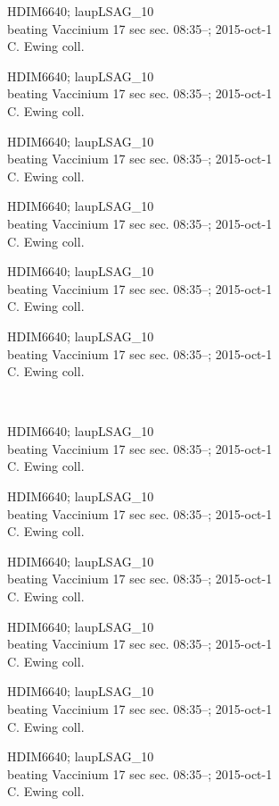 \documentclass[2pt]{extarticle}
\begin{document}
\noindent
\parbox{0.16\textwidth}{\tiny \raggedright \rule[-0.3\baselineskip]{0pt}{10pt}HDIM6640; laupLSAG\_10\\ beating Vaccinium 17 sec sec. 08:35--; 2015-oct-1\\ C. Ewing coll.}
\parbox{0.16\textwidth}{\tiny \raggedright \rule[-0.3\baselineskip]{0pt}{10pt}HDIM6640; laupLSAG\_10\\ beating Vaccinium 17 sec sec. 08:35--; 2015-oct-1\\ C. Ewing coll.}
\parbox{0.16\textwidth}{\tiny \raggedright \rule[-0.3\baselineskip]{0pt}{10pt}HDIM6640; laupLSAG\_10\\ beating Vaccinium 17 sec sec. 08:35--; 2015-oct-1\\ C. Ewing coll.}
\parbox{0.16\textwidth}{\tiny \raggedright \rule[-0.3\baselineskip]{0pt}{10pt}HDIM6640; laupLSAG\_10\\ beating Vaccinium 17 sec sec. 08:35--; 2015-oct-1\\ C. Ewing coll.}
\parbox{0.16\textwidth}{\tiny \raggedright \rule[-0.3\baselineskip]{0pt}{10pt}HDIM6640; laupLSAG\_10\\ beating Vaccinium 17 sec sec. 08:35--; 2015-oct-1\\ C. Ewing coll.}
\parbox{0.16\textwidth}{\tiny \raggedright \rule[-0.3\baselineskip]{0pt}{10pt}HDIM6640; laupLSAG\_10\\ beating Vaccinium 17 sec sec. 08:35--; 2015-oct-1\\ C. Ewing coll.} \\ 
\vspace{0.001in} 

\noindent
\parbox{0.16\textwidth}{\tiny \raggedright \rule[-0.3\baselineskip]{0pt}{10pt}HDIM6640; laupLSAG\_10\\ beating Vaccinium 17 sec sec. 08:35--; 2015-oct-1\\ C. Ewing coll.}
\parbox{0.16\textwidth}{\tiny \raggedright \rule[-0.3\baselineskip]{0pt}{10pt}HDIM6640; laupLSAG\_10\\ beating Vaccinium 17 sec sec. 08:35--; 2015-oct-1\\ C. Ewing coll.}
\parbox{0.16\textwidth}{\tiny \raggedright \rule[-0.3\baselineskip]{0pt}{10pt}HDIM6640; laupLSAG\_10\\ beating Vaccinium 17 sec sec. 08:35--; 2015-oct-1\\ C. Ewing coll.}
\parbox{0.16\textwidth}{\tiny \raggedright \rule[-0.3\baselineskip]{0pt}{10pt}HDIM6640; laupLSAG\_10\\ beating Vaccinium 17 sec sec. 08:35--; 2015-oct-1\\ C. Ewing coll.}
\parbox{0.16\textwidth}{\tiny \raggedright \rule[-0.3\baselineskip]{0pt}{10pt}HDIM6640; laupLSAG\_10\\ beating Vaccinium 17 sec sec. 08:35--; 2015-oct-1\\ C. Ewing coll.}
\parbox{0.16\textwidth}{\tiny \raggedright \rule[-0.3\baselineskip]{0pt}{10pt}HDIM6640; laupLSAG\_10\\ beating Vaccinium 17 sec sec. 08:35--; 2015-oct-1\\ C. Ewing coll.} \\ 
\vspace{0.001in} 
\end{document}
